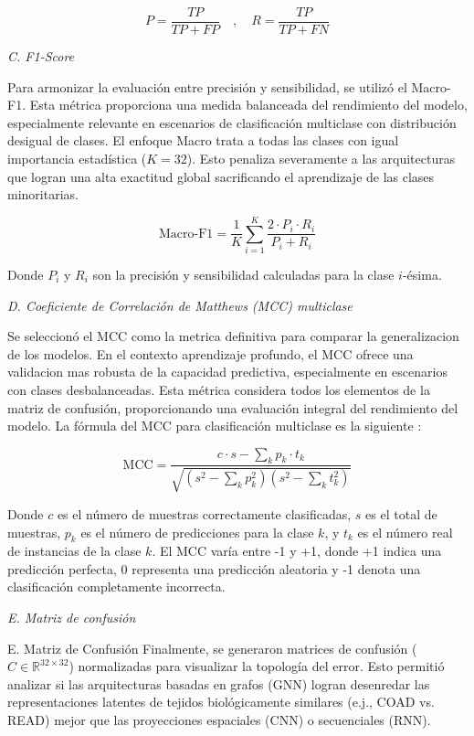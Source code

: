 \documentclass[review,12pt,times,number]{elsarticle}
\begin{document}
\begin{equation*}
    P = \frac{TP}{TP + FP} \quad , \quad R = \frac{TP}{TP + FN}
\end{equation*}

\textit{C. F1-Score}

Para armonizar la evaluación entre precisión y sensibilidad, se utilizó el Macro-F1. Esta métrica proporciona una medida balanceada del rendimiento del modelo, especialmente relevante en escenarios de clasificación multiclase con distribución desigual de clases. El enfoque Macro trata a todas las clases con igual importancia estadística ($K=32$). Esto penaliza severamente a las arquitecturas que logran una alta exactitud global sacrificando el aprendizaje de las clases minoritarias.

\begin{equation*}
    \text{Macro-F1} = \frac{1}{K} \sum_{i=1}^{K} \frac{2 \cdot P_i \cdot R_i}{P_i + R_i}
\end{equation*}

Donde $P_i$ y $R_i$ son la precisión y sensibilidad calculadas para la clase $i$-ésima.

\textit{D. Coeficiente de Correlación de Matthews (MCC) multiclase}

Se seleccionó el MCC como la metrica definitiva para comparar la generalizacion de los modelos. En el contexto aprendizaje profundo, el MCC ofrece una validacion mas robusta de la capacidad predictiva, especialmente en escenarios con clases desbalanceadas. Esta métrica considera todos los elementos de la matriz de confusión, proporcionando una evaluación integral del rendimiento del modelo. La fórmula del MCC para clasificación multiclase es la siguiente \cite{gorodkin2004comparing}:

\begin{equation*}
    \text{MCC} = \frac{c \cdot s - \sum_{k} p_k \cdot t_k}{\sqrt{(s^2 - \sum_{k} p_k^2)(s^2 - \sum_{k} t_k^2)}}
\end{equation*}

Donde $c$ es el número de muestras correctamente clasificadas, $s$ es el total de muestras, $p_k$ es el número de predicciones para la clase $k$, y $t_k$ es el número real de instancias de la clase $k$. El MCC varía entre -1 y +1, donde +1 indica una predicción perfecta, 0 representa una predicción aleatoria y -1 denota una clasificación completamente incorrecta.

\textit{E. Matriz de confusión}

E. Matriz de Confusión
Finalmente, se generaron matrices de confusión ($C \in \mathbb{R}^{32 \times 32}$) normalizadas para visualizar la topología del error. Esto permitió analizar si las arquitecturas basadas en grafos (GNN) logran desenredar las representaciones latentes de tejidos biológicamente similares (e.j., COAD vs. READ) mejor que las proyecciones espaciales (CNN) o secuenciales (RNN).
\end{document}

